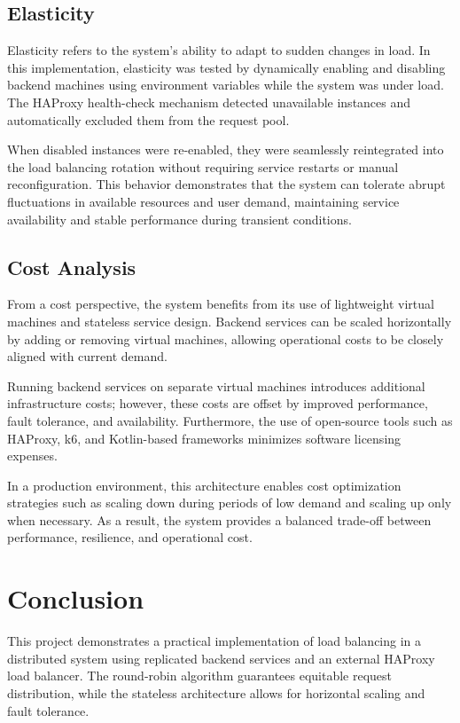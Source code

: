 \documentclass[conference]{IEEEtran}
\begin{document}
\subsection{Elasticity}

Elasticity refers to the system’s ability to adapt to sudden changes in load. In this implementation, elasticity was tested by dynamically enabling and disabling backend machines using environment variables while the system was under load. The HAProxy health-check mechanism detected unavailable instances and automatically excluded them from the request pool.

When disabled instances were re-enabled, they were seamlessly reintegrated into the load balancing rotation without requiring service restarts or manual reconfiguration. This behavior demonstrates that the system can tolerate abrupt fluctuations in available resources and user demand, maintaining service availability and stable performance during transient conditions.

\subsection{Cost Analysis}

From a cost perspective, the system benefits from its use of lightweight virtual machines and stateless service design. Backend services can be scaled horizontally by adding or removing virtual machines, allowing operational costs to be closely aligned with current demand.

Running backend services on separate virtual machines introduces additional infrastructure costs; however, these costs are offset by improved performance, fault tolerance, and availability. Furthermore, the use of open-source tools such as HAProxy, k6, and Kotlin-based frameworks minimizes software licensing expenses.

In a production environment, this architecture enables cost optimization strategies such as scaling down during periods of low demand and scaling up only when necessary. As a result, the system provides a balanced trade-off between performance, resilience, and operational cost.

\section{Conclusion}

This project demonstrates a practical implementation of load balancing in a distributed system using replicated backend services and an external HAProxy load balancer. The round-robin algorithm guarantees equitable request distribution, while the stateless architecture allows for horizontal scaling and fault tolerance.
\end{document}
